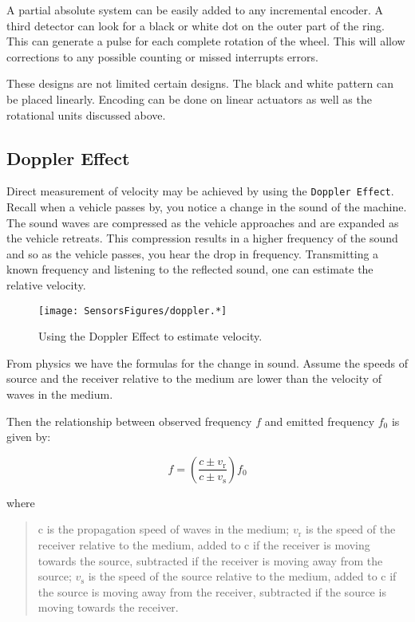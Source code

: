 A partial absolute system can be easily added to any incremental
encoder. A third detector can look for a black or white dot on the outer
part of the ring. This can generate a pulse for each complete rotation
of the wheel. This will allow corrections to any possible counting or
missed interrupts errors.

These designs are not limited certain designs. The black and white
pattern can be placed linearly. Encoding can be done on linear actuators
as well as the rotational units discussed above.

\hypertarget{doppler-effect}{%
\subsection{Doppler Effect}\label{doppler-effect}}

Direct measurement of velocity may be achieved by using the
\texttt{Doppler
Effect}. Recall when a vehicle passes by, you notice a change in the
sound of the machine. The sound waves are compressed as the vehicle
approaches and are expanded as the vehicle retreats. This compression
results in a higher frequency of the sound and so as the vehicle passes,
you hear the drop in frequency. Transmitting a known frequency and
listening to the reflected sound, one can estimate the relative
velocity.

\begin{figure}
\centering
\texttt{[image: SensorsFigures/doppler.*]}
\caption{Using the Doppler Effect to estimate velocity.}
\end{figure}

From physics we have the formulas for the change in sound. Assume the
speeds of source and the receiver relative to the medium are lower than
the velocity of waves in the medium.

Then the relationship between observed frequency \(f\) and emitted
frequency \(f_0\) is given by:

\[{\displaystyle f=\left({\frac {c\pm v_{\text{r}}}{c\pm v_{\text{s}}}}\right)f_{0}}\]

where

\begin{quote}
c is the propagation speed of waves in the medium;
\({\displaystyle v_{\text{r}}}\) is the speed of the receiver relative
to the medium, added to c if the receiver is moving towards the source,
subtracted if the receiver is moving away from the source;
\({\displaystyle v_{\text{s}}}\) is the speed of the source relative to
the medium, added to c if the source is moving away from the receiver,
subtracted if the source is moving towards the receiver.
\end{quote}

